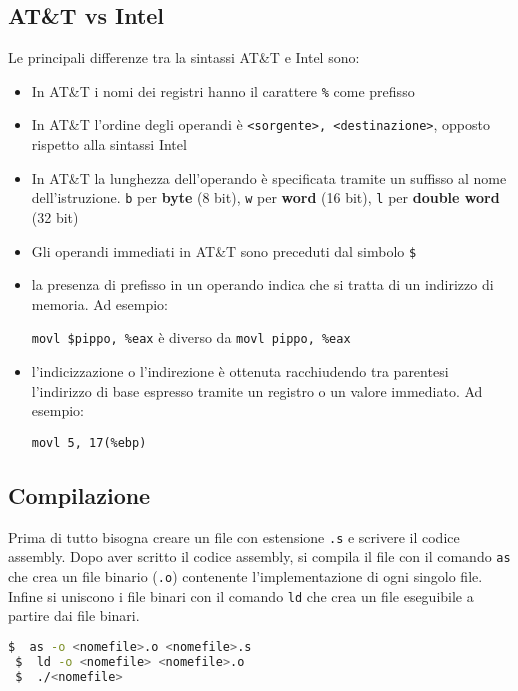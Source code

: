 \documentclass[a4paper]{article}
\theoremstyle{break}
\theoremstyle{break}
\theoremstyle{break}
\theoremstyle{break}
\begin{document}
\subsection{AT\&T vs Intel}
Le principali differenze tra la sintassi AT\&T e Intel sono:
\begin{itemize}
  \item In AT\&T i nomi dei registri hanno il carattere \texttt{\%} come prefisso
  \item In AT\&T l'ordine degli operandi è \texttt{<sorgente>, <destinazione>}, opposto
    rispetto alla sintassi Intel
  \item In AT\&T la lunghezza dell'operando è specificata tramite un suffisso al nome
    dell'istruzione. \texttt{b} per \textbf{byte} (8 bit), \texttt{w} per \textbf{word} (16 bit),
    \texttt{l} per \textbf{double word} (32 bit)
  \item Gli operandi immediati in AT\&T sono preceduti dal simbolo \texttt{\$}
  \item la presenza di prefisso in un operando indica che si tratta di un
indirizzo di memoria. Ad esempio:
\begin{center}
  \texttt{movl \$pippo, \%eax} \quad è diverso da \quad \texttt{movl pippo, \%eax}
\end{center}
\item l'indicizzazione o l'indirezione è ottenuta racchiudendo tra parentesi
l'indirizzo di base espresso tramite un registro o un valore immediato.
Ad esempio:
\begin{center}
  \texttt{movl 5, 17(\%ebp)}
\end{center}
\end{itemize}

\subsection{Compilazione}
Prima di tutto bisogna creare un file con estensione \texttt{.s} e scrivere il codice assembly.
Dopo aver scritto il codice assembly, si compila il file con il comando \texttt{as} che crea un file binario
(\texttt{.o}) contenente l'implementazione di ogni singolo file. Infine si uniscono i file binari con il comando
\texttt{ld} che crea un file eseguibile a partire dai file binari.

\begin{lstlisting}[language=bash]
 $  as -o <nomefile>.o <nomefile>.s
 $  ld -o <nomefile> <nomefile>.o
 $  ./<nomefile>
  
\end{lstlisting}

\end{document}
